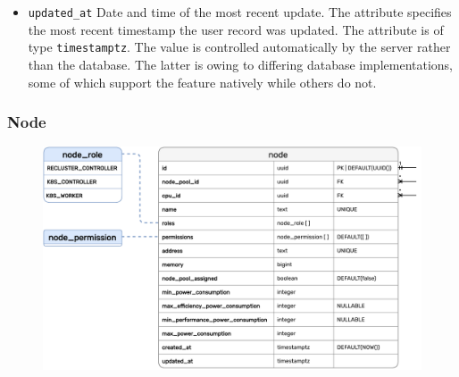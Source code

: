 \begin{itemize}
  \item \texttt{updated\_at}
    \newline
    Date and time of the most recent update.
    \newline
    The attribute specifies the most recent timestamp the user record was updated.
    \newline
    The attribute is of type \texttt{timestamptz}.
    \newline
    The value is controlled automatically by the server rather than the database.
    The latter is owing to differing database implementations, some of which
    support the feature natively while others do not.
\end{itemize}

\pagebreak


\subsubsection{Node}
\label{subsubsec:implementation_server_database_node}

\begin{figure}[htbp]
  \centering
  \includegraphics[width=.75\textwidth]{images/implementation/erm_node.pdf}
\end{figure}

